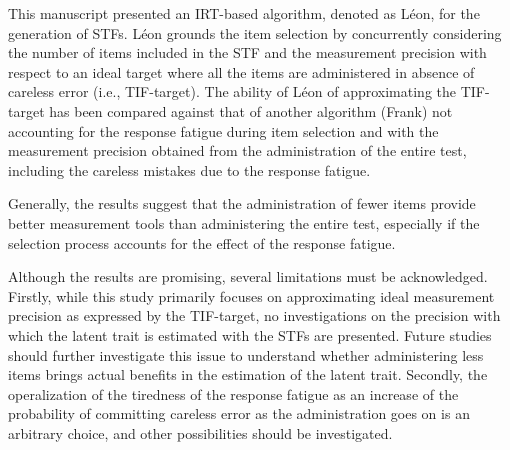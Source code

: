 \documentclass{svproc}
\begin{document}
This manuscript presented an IRT-based algorithm, denoted as Léon, for the generation of  STFs. 
Léon grounds the item selection by concurrently considering the number of items included in the STF and the measurement precision with respect to an ideal target where all the items are administered in absence of careless error (i.e., TIF-target). The ability of Léon of approximating the TIF-target has been compared against that of another algorithm (Frank) not accounting for the response fatigue during item selection and with the measurement precision obtained from the administration of the entire test, including the careless mistakes due to the response fatigue.
 

Generally, the results suggest that the administration of fewer items provide better measurement tools than administering the entire test, especially if the selection process accounts for the effect of the response fatigue.

Although the results are promising, several limitations must be acknowledged. Firstly, while this study primarily focuses on approximating ideal measurement precision as expressed by the TIF-target, no investigations on the precision with which the latent trait is estimated with the STFs are presented. Future studies should further investigate this issue to understand whether administering less items brings actual benefits in the estimation of the latent trait.
Secondly, the operalization of the tiredness of the response fatigue as an increase of the probability of committing careless error as the administration goes on is an arbitrary choice, and other possibilities should be investigated.
\end{document}
